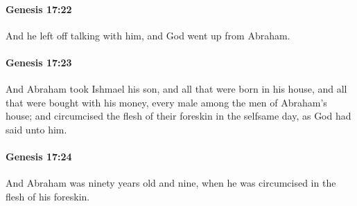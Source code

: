 		\paragraph{Genesis 17:22} %
			\label{GENESIS-17-22}

			And he left off talking with him, and God went up from Abraham.


		\paragraph{Genesis 17:23} %
			\label{GENESIS-17-23}

			And Abraham took Ishmael his son, and all that were born in his house, and all that were bought with his money, every male among the men of Abraham's house; and circumcised the flesh of their foreskin in the selfsame day, as God had said unto him.


		\paragraph{Genesis 17:24} %
			\label{GENESIS-17-24}

			And Abraham was ninety years old and nine, when he was circumcised in the flesh of his foreskin.



